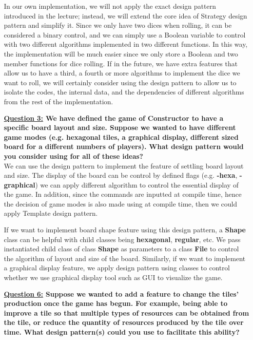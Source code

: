 \documentclass[11pt]{article}
\begin{document}
In our own implementation, we will not apply the exact \Strategy design pattern introduced in the lecture; instead, we will extend the core idea of Strategy design pattern and simplify it. Since we only have two dices when rolling, it can be considered a binary control, and we can simply use a Boolean variable to control with two different algorithms implemented in two different functions. In this way, the implementation will be much easier since we only store a Boolean and two member functions for dice rolling. If in the future, we have extra features that allow us to have a third, a fourth or more algorithms to implement the dice we want to roll, we will certainly consider using the \Strategy design pattern to allow us to isolate the codes, the internal data, and the dependencies of different algorithms from the rest of the implementation.

\textbf{\underline{Question 3:} We have defined the game of Constructor to have a specific board layout and size. Suppose we wanted to have different game modes (e.g. hexagonal tiles, a graphical display, different sized board for a different numbers of players). What design pattern would you consider using for all of these ideas?}\\

We can use the \Template design pattern to implement the feature of settling board layout and size. The display of the board can be control by defined flags (e.g. \textbf{-hexa}, \textbf{-graphical}) we can apply different algorithm to control the essential display of the game. In addition, since the commands are inputted at compile time, hence the decision of game modes is also made using at compile time, then we could apply Template design pattern.

If we want to implement board shape feature using this \Template design pattern, a \textbf{Shape} class can be helpful with child classes being \textbf{hexagonal}, \textbf{regular}, etc. We pass instantiated child class of class \textbf{Shape} as parameters to a class \textbf{File} to control the algorithm of layout and size of the board.  Similarly, if we want to implement a graphical display feature, we apply \Template design pattern using classes to control whether we use graphical display tool such as GUI to visualize the game.

\textbf{\underline{Question 6:} Suppose we wanted to add a feature to change the tiles’ production once the game has begun. For example, being able to improve a tile so that multiple types of resources can be obtained from the tile, or reduce the quantity of resources produced by the tile over time. What design pattern(s) could you use to facilitate this ability?}\\
\end{document}
